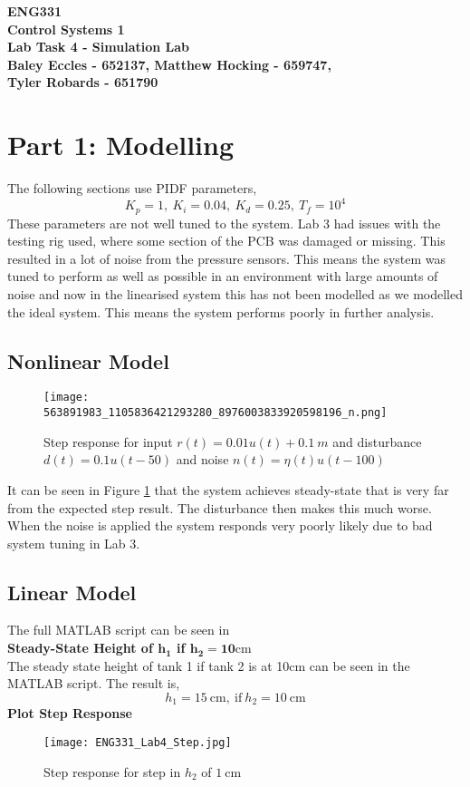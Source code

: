 \documentclass[12pt,a4paper]{article}
\begin{document}
\begin{center}
\textbf{\LARGE ENG331\\[6pt]
Control Systems 1}\\[10pt]
\textbf{\large Lab Task 4 - Simulation Lab\\[4pt]
Baley Eccles - 652137, Matthew Hocking - 659747,\\ Tyler Robards - 651790}\\
\end{center}

\section*{Part 1: Modelling}
The following sections use PIDF parameters,
$$K_p=1,\:K_i=0.04,\:K_d=0.25,\:T_f=10^4$$
These parameters are not well tuned to the system. Lab 3 had issues with the testing rig used, where some section of the PCB was damaged or missing. This resulted in a lot of noise from the pressure sensors. This means the system was tuned to perform as well as possible in an environment with large amounts of noise and now in the linearised system this has not been modelled as we modelled the ideal system. This means the system performs poorly in further analysis.
\subsection*{Nonlinear Model}
\begin{figure}[H]
	\centering
	\texttt{[image: 563891983\_1105836421293280\_8976003833920598196\_n.png]}
	\caption{Step response for input $r(t)=0.01u(t)+0.1\:m$ and disturbance $d(t)=0.1u(t-50)$ and noise $n(t)=\eta(t)u(t-100)$}
	\label{fig:nonlinear}
\end{figure}
It can be seen in Figure \ref{fig:nonlinear} that the system achieves steady-state that is very far from the expected step result. The disturbance then makes this much worse. When the noise is applied the system responds very poorly likely due to bad system tuning in Lab 3.
\subsection*{Linear Model}
The full MATLAB script can be seen in \\
\textbf{Steady-State Height of $\mathbf{h_1}$ if $\mathbf{h_2=10}\text{cm}$}\\
The steady state height of tank 1 if tank 2 is at 10cm can be seen in the MATLAB script. The result is,
$$h_1=15\:\text{cm},\:\text{if}\:h_2=10\:\text{cm}$$
\textbf{Plot Step Response}
\begin{figure}[H]
	\centering
	\texttt{[image: ENG331\_Lab4\_Step.jpg]}
	\caption{Step response for step in $h_2$ of $1\:\text{cm}$}
\end{figure}
\end{document}
